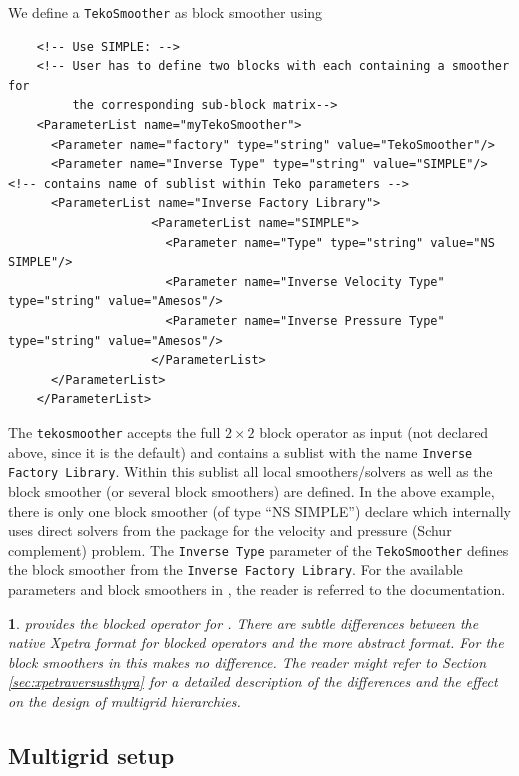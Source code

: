 \documentclass[10pt,fleqn]{book}
\newtheorem*{mycomment}{\ding{42}}
\begin{document}
We define a \texttt{TekoSmoother} as block smoother using
\begin{lstlisting}
    <!-- Use SIMPLE: -->
    <!-- User has to define two blocks with each containing a smoother for
         the corresponding sub-block matrix-->
    <ParameterList name="myTekoSmoother">
      <Parameter name="factory" type="string" value="TekoSmoother"/>
      <Parameter name="Inverse Type" type="string" value="SIMPLE"/> <!-- contains name of sublist within Teko parameters -->
      <ParameterList name="Inverse Factory Library">
                    <ParameterList name="SIMPLE">
                      <Parameter name="Type" type="string" value="NS SIMPLE"/>
                      <Parameter name="Inverse Velocity Type" type="string" value="Amesos"/>
                      <Parameter name="Inverse Pressure Type" type="string" value="Amesos"/>
                    </ParameterList>
      </ParameterList>
    </ParameterList>
\end{lstlisting}

The \texttt{tekosmoother} accepts the full $2\times 2$ block operator as input (not declared above, since it is the default) and contains a sublist with the name \texttt{Inverse Factory Library}. Within this sublist all local smoothers/solvers as well as the \teko block smoother (or several \teko block smoothers) are defined. In the above example, there is only one \teko block smoother (of type ``NS SIMPLE'') declare which internally uses direct solvers from the \amesos package for the velocity and pressure (Schur complement) problem.
The \texttt{Inverse Type} parameter of the \texttt{TekoSmoother} defines the \teko block smoother from the \texttt{Inverse Factory Library}.
For the available parameters and block smoothers in \teko, the reader is referred to the \teko documentation.

\begin{mycomment}
\muelu provides the \thyra blocked operator for \teko. There are subtle differences between the native Xpetra format for blocked operators and the more abstract \thyra format. For the block smoothers in \teko this makes no difference. The reader might refer to Section \ref{sec:xpetraversusthyra} for a detailed description of the differences and the effect on the design of multigrid hierarchies.
\end{mycomment}

\subsection{Multigrid setup}
\end{document}

